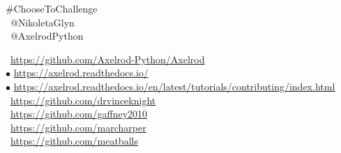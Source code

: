 \documentclass{beamer}
\begin{document}
\begin{frame}
    \begin{center}
        \small
    \#ChooseToChallenge \\
    \faTwitter \ @NikoletaGlyn \\
    \faTwitter \ @AxelrodPython \\
    
    \vspace{1cm}
    \end{center}

    \footnotesize
    \faGithub \ \url{https://github.com/Axelrod-Python/Axelrod} \\
    $\bullet$ \url{https://axelrod.readthedocs.io/} \\
    $\bullet$ \url{https://axelrod.readthedocs.io/en/latest/tutorials/contributing/index.html} \\

    \faGithub  \ \url{https://github.com/drvinceknight} \\
    \faGithub  \ \url{https://github.com/gaffney2010} \\
    \faGithub  \ \url{https://github.com/marcharper} \\
    \faGithub  \ \url{https://github.com/meatballs} \\
\end{frame}
\end{document}
